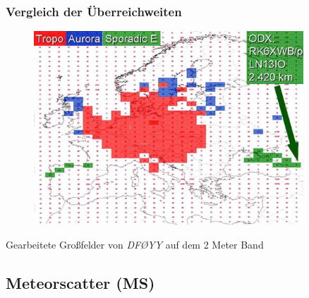 \begin{frame}
  \frametitle{Vergleich der Überreichweiten}

  \begin{center}
    \begin{figure}
      \includegraphics[width=0.9\textwidth,height=.65\textheight,keepaspectratio]{bv11/df0yy_2m-karte.jpg}
    \end{figure}

    Gearbeitete Großfelder von \emph{DFØYY} auf dem 2 Meter Band
  \end{center}

\end{frame}

\subsection[Meteorscatter]{Meteorscatter (MS)}

